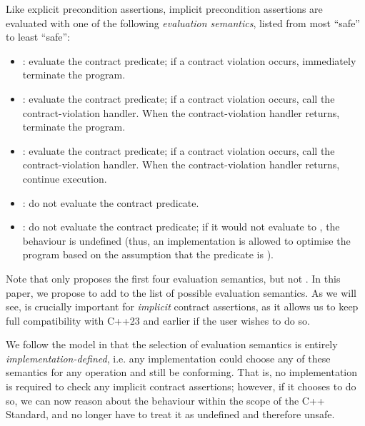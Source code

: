 Like explicit precondition assertions, implicit precondition assertions are evaluated with one of the following \emph{evaluation semantics}, listed from most ``safe'' to least ``safe'':
\begin{itemize}
\item {}: evaluate the contract predicate; if a contract violation occurs, immediately terminate the program.
\item {}: evaluate the contract predicate; if a contract violation occurs, call the contract-violation handler. When the contract-violation handler returns, terminate the program.
\item {}: evaluate the contract predicate; if a contract violation occurs, call the contract-violation handler. When the contract-violation handler returns, continue execution.
\item {}: do not evaluate the contract predicate.
\item {}: do not evaluate the contract predicate; if it would not evaluate to , the behaviour is undefined (thus, an implementation is allowed to optimise the program based on the assumption that the predicate is ).
\end{itemize}
Note that \cite{P2900R6} only proposes the first four evaluation semantics, but not . In this paper, we propose to add  to the list of possible evaluation semantics. As we will see,  is crucially important for \emph{implicit} contract assertions, as it allows us to keep full compatibility with C++23 and earlier if the user wishes to do so.

We follow the model in \cite{P2900R6} that the selection of evaluation semantics is entirely \emph{implementation-defined}, i.e. any implementation could choose any of these semantics for any operation and still be conforming. That is, no implementation is required to check any implicit contract assertions; however, if it chooses to do so, we can now reason about the behaviour within the scope of the C++ Standard, and no longer have to treat it as undefined and therefore unsafe.

